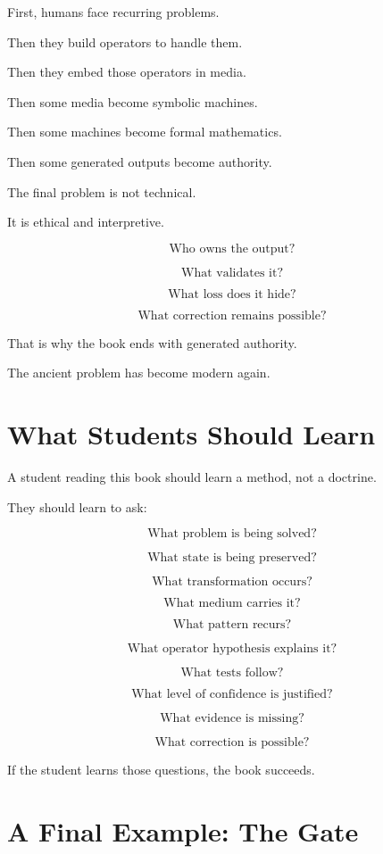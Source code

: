 \documentclass[11pt]{book}
\begin{document}
First, humans face recurring problems.

Then they build operators to handle them.

Then they embed those operators in media.

Then some media become symbolic machines.

Then some machines become formal mathematics.

Then some generated outputs become authority.

The final problem is not technical.

It is ethical and interpretive.

\[
\text{Who owns the output?}
\]

\[
\text{What validates it?}
\]

\[
\text{What loss does it hide?}
\]

\[
\text{What correction remains possible?}
\]

That is why the book ends with generated authority.

The ancient problem has become modern again.

\section{What Students Should Learn}

A student reading this book should learn a method, not a doctrine.

They should learn to ask:

\[
\text{What problem is being solved?}
\]

\[
\text{What state is being preserved?}
\]

\[
\text{What transformation occurs?}
\]

\[
\text{What medium carries it?}
\]

\[
\text{What pattern recurs?}
\]

\[
\text{What operator hypothesis explains it?}
\]

\[
\text{What tests follow?}
\]

\[
\text{What level of confidence is justified?}
\]

\[
\text{What evidence is missing?}
\]

\[
\text{What correction is possible?}
\]

If the student learns those questions, the book succeeds.

\section{A Final Example: The Gate}
\end{document}
